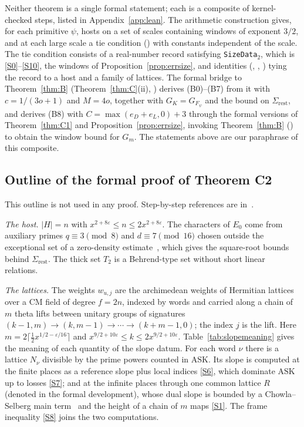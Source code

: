 \documentclass[11pt]{amsart}
\newcommand{\eps}{\varepsilon}
\newcommand{\ASK}{\mathrm{ASK}}
\theoremstyle{plain}
\theoremstyle{definition}
\numberwithin{equation}{section}
\begin{document}
Neither theorem is a single formal statement; each is a composite of kernel-checked steps, listed
in Appendix~\ref{app:lean}. The arithmetic construction gives, for each primitive $\psi$, hosts on
a set of scales containing windows of exponent $3/2$, and at each large scale a tie condition
() with constants independent of the scale. The tie condition consists of a
real-number record satisfying \texttt{SizeData}$_2$, which is \ref{S0}--\ref{S10}, the windows
 of Proposition~\ref{prop:errsize}, and identities (,
, ) tying the record to a host and a family of lattices. The formal bridge to Theorem~\ref{thm:B} (Theorem~\ref{thm:C}(ii), ) derives
(B0)--(B7) from it with $c=1/(3o+1)$ and $M=4o$, together with $G_K=G_{F_\psi}$ and the bound on
$\Sigma_{\mathrm{rest}}$, and derives (B8) with $C=\max(e_D+e_L,0)+3$ through the formal versions
of Theorem~\ref{thm:C1} and Proposition~\ref{prop:errsize}, invoking Theorem~\ref{thm:B}
() to obtain the window bound for $G_m$. The statements above are our
paraphrase of this composite.

\subsection{Outline of the formal proof of Theorem C2}

This outline is not used in any proof. Step-by-step references are in~\cite{dixit-account}.

\emph{The host.} $|H|=n$ with $x^{2+8\eps}\le n\le2x^{2+8\eps}$. The characters of $E_0$ come from
auxiliary primes $q\equiv3\pmod8$ and $d\equiv7\pmod{16}$ chosen outside the exceptional set of a
zero-density estimate~\cite[Chapter~10]{iwaniec-kowalski}, which gives the square-root bounds behind
$\Sigma_{\mathrm{rest}}$. The thick set $T_2$ is a Behrend-type set without short linear relations.

\emph{The lattices.} The weights $w_{u,j}$ are the archimedean weights of Hermitian lattices over a
CM field of degree $f=2n$, indexed by words and carried along a chain of $m$ theta lifts between
unitary groups of signatures $(k-1,m)\to(k,m-1)\to\cdots\to(k+m-1,0)$; the index $j$ is the lift.
Here $m=2\lceil\frac12x^{1/2-\eps/16}\rceil$ and $x^{9/2+10\eps}\le k\le2x^{9/2+10\eps}$.
Table~\ref{tab:slopemeaning} gives the meaning of each quantity of the slope datum. For each word
$\nu$ there is a lattice $N_\nu$ divisible by the prime powers counted in $\ASK$. Its slope is
computed at the finite places as a reference slope plus local indices \ref{S6}, which dominate
$\ASK$ up to losses \ref{S7}; and at the infinite places through one common lattice $R$ (denoted
 in the formal development), whose dual slope is bounded by a Chowla--Selberg main
term~\cite{chowla-selberg} and the height of a chain of $m$ maps \ref{S1}. The frame inequality
\ref{S8} joins the two computations.
\end{document}
